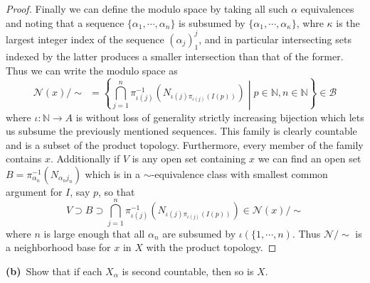 \documentclass[11pt]{amsart}
\theoremstyle{definition}
\numberwithin{theorem}{section}
\numberwithin{definition}{section}
\numberwithin{equation}{section}
\def\scriptb{{\mathcal B}}
\def\scriptn{{\mathcal N}}
\begin{document}
\begin{proof}
	Finally we can define the modulo space by taking all such $\alpha$ equivalences and noting that a sequence $\{\alpha_1, \cdots, \alpha_n\}$ is subsumed by $\{\alpha_1 ,\cdots, \alpha_\kappa\}$, whre $\kappa$ is the largest integer index of the sequence $(\alpha_j)_1^j$, and in particular intersecting sets indexed by the latter produces a smaller intersection than that of the former. Thus we can write the modulo space as
	\begin{equation*}
		{\scriptn}(x)/\sim\ \  =\left\{\bigcap_{j=1}^n \pi^{-1}_{\iota(j)}\left(N_{\iota(j) \pi_{\iota(j)}(I(p))}\right)\mathrel{}\middle|\mathrel{} p \in \mathbb{N}, n \in \mathbb{N} \right\} \in \scriptb
	\end{equation*}
	where $\iota: \mathbb{N} \to A$ is without loss of generality strictly increasing bijection which lets us subsume the previously mentioned sequences. This family is clearly countable and is a subset of the product topology. Furthermore, every member of the family contains $x$. Additionally if $V$ is any open set containing $x$ we can find an open set $B = \pi^{-1}_{\alpha_n}\left(N_{\alpha_n j_n}\right) $ which is in a $\sim$-equivalence class with smallest common argument for $I$, say $p$, so that $$V \supset B \supset  \bigcap_{j=1}^n \pi^{-1}_{\iota(j)}\left(N_{\iota(j) \pi_{\iota(j)}(I(p))}\right) \in \scriptn(x)/\sim$$
	where $n$ is large enough that all $\alpha_n$ are subsumed by $\iota(\{1,\cdots,n).$ Thus $\scriptn/\sim$ is a neighborhood base for $x$ in $X$ with the product topology.
	\end{proof}
	{\bf (b)}\ 
Show that if each $X_\alpha$ is second countable, then so is $X$.
\end{document}
